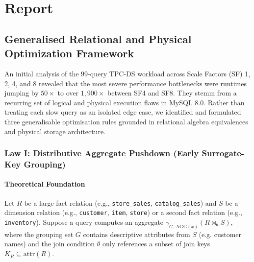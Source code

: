 \documentclass{ULBreport}
\begin{document}

\chapter{Report}

\section{Generalised Relational and Physical Optimization Framework}

An initial analysis of the 99-query TPC-DS workload across Scale Factors (SF) 1, 2, 4, and 8 revealed that the most severe performance bottlenecks were runtimes jumping by $50\times$ to over $1,900\times$ between SF4 and SF8. They stemm from a recurring set of logical and physical execution flaws in MySQL 8.0. Rather than treating each slow query as an isolated edge case, we identified and formulated three generalisable optimisation rules grounded in relational algebra equivalences and physical storage architecture.

\subsection{Law I: Distributive Aggregate Pushdown (Early Surrogate-Key Grouping)}

\subsubsection{Theoretical Foundation}
Let $R$ be a large fact relation (e.g., \texttt{store\_sales}, \texttt{catalog\_sales}) and $S$ be a dimension relation (e.g., \texttt{customer}, \texttt{item}, \texttt{store}) or a second fact relation (e.g., \texttt{inventory}). Suppose a query computes an aggregate $\gamma_{G,\, \text{AGG}(x)}(R \bowtie_{\theta} S)$, where the grouping set $G$ contains descriptive attributes from $S$ (e.g. customer names) and the join condition $\theta$ only references a subset of join keys $K_R \subseteq \text{attr}(R)$.
\end{document}
